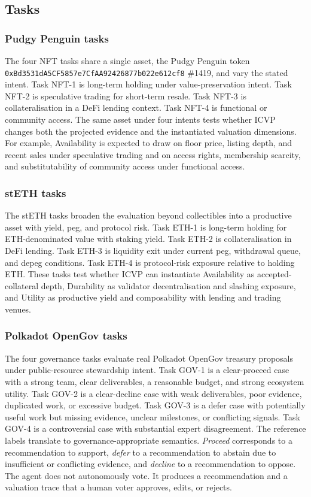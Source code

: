\subsection{Tasks}

\subsubsection{Pudgy Penguin tasks}

The four NFT tasks share a single asset, the Pudgy Penguin token \texttt{0xBd3531dA5CF5857e7CfAA92426877b022e612cf8} \#1419, and vary the stated intent. Task NFT-1 is long-term holding under value-preservation intent. Task NFT-2 is speculative trading for short-term resale. Task NFT-3 is collateralisation in a DeFi lending context. Task NFT-4 is functional or community access. The same asset under four intents tests whether ICVP changes both the projected evidence and the instantiated valuation dimensions. For example, Availability is expected to draw on floor price, listing depth, and recent sales under speculative trading and on access rights, membership scarcity, and substitutability of community access under functional access.

\subsubsection{stETH tasks}

The stETH tasks broaden the evaluation beyond collectibles into a productive asset with yield, peg, and protocol risk. Task ETH-1 is long-term holding for ETH-denominated value with staking yield. Task ETH-2 is collateralisation in DeFi lending. Task ETH-3 is liquidity exit under current peg, withdrawal queue, and depeg conditions. Task ETH-4 is protocol-risk exposure relative to holding ETH. These tasks test whether ICVP can instantiate Availability as accepted-collateral depth, Durability as validator decentralisation and slashing exposure, and Utility as productive yield and composability with lending and trading venues.

\subsubsection{Polkadot OpenGov tasks}

The four governance tasks evaluate real Polkadot OpenGov treasury proposals under public-resource stewardship intent. Task GOV-1 is a clear-proceed case with a strong team, clear deliverables, a reasonable budget, and strong ecosystem utility. Task GOV-2 is a clear-decline case with weak deliverables, poor evidence, duplicated work, or excessive budget. Task GOV-3 is a defer case with potentially useful work but missing evidence, unclear milestones, or conflicting signals. Task GOV-4 is a controversial case with substantial expert disagreement. The reference labels translate to governance-appropriate semantics. \textit{Proceed} corresponds to a recommendation to support, \textit{defer} to a recommendation to abstain due to insufficient or conflicting evidence, and \textit{decline} to a recommendation to oppose. The agent does not autonomously vote. It produces a recommendation and a valuation trace that a human voter approves, edits, or rejects.

